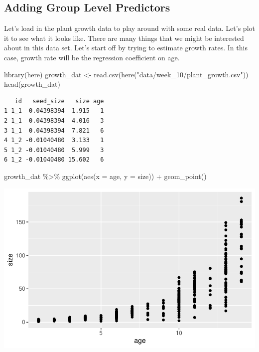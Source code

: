 \documentclass[
  letterpaper,
  DIV=11,
  numbers=noendperiod]{scrartcl}
\newenvironment{Shaded}{\begin{snugshade}}{\end{snugshade}}
\newcommand{\AttributeTok}[1]{\textcolor[rgb]{0.40,0.45,0.13}{#1}}
\newcommand{\FunctionTok}[1]{\textcolor[rgb]{0.28,0.35,0.67}{#1}}
\newcommand{\NormalTok}[1]{\textcolor[rgb]{0.00,0.23,0.31}{#1}}
\newcommand{\OtherTok}[1]{\textcolor[rgb]{0.00,0.23,0.31}{#1}}
\newcommand{\SpecialCharTok}[1]{\textcolor[rgb]{0.37,0.37,0.37}{#1}}
\newcommand{\StringTok}[1]{\textcolor[rgb]{0.13,0.47,0.30}{#1}}
\begin{document}
\subsection{Adding Group Level
Predictors}\label{adding-group-level-predictors}

Let's load in the plant growth data to play around with some real data.
Let's plot it to see what it looks like. There are many things that we
might be interested about in this data set. Let's start off by trying to
estimate growth rates. In this case, growth rate will be the regression
coefficient on age.

\begin{Shaded}
\begin{Highlighting}[]
\FunctionTok{library}\NormalTok{(here)}
\NormalTok{growth\_dat }\OtherTok{\textless{}{-}} \FunctionTok{read.csv}\NormalTok{(}\FunctionTok{here}\NormalTok{(}\StringTok{"data/week\_10/plant\_growth.csv"}\NormalTok{))}
\FunctionTok{head}\NormalTok{(growth\_dat)}
\end{Highlighting}
\end{Shaded}

\begin{verbatim}
   id   seed_size   size age
1 1_1  0.04398394  1.915   1
2 1_1  0.04398394  4.016   3
3 1_1  0.04398394  7.821   6
4 1_2 -0.01040480  3.133   1
5 1_2 -0.01040480  5.999   3
6 1_2 -0.01040480 15.602   6
\end{verbatim}

\begin{Shaded}
\begin{Highlighting}[]
\NormalTok{growth\_dat }\SpecialCharTok{\%\textgreater{}\%} 
  \FunctionTok{ggplot}\NormalTok{(}\FunctionTok{aes}\NormalTok{(}\AttributeTok{x =}\NormalTok{ age, }\AttributeTok{y =}\NormalTok{ size)) }\SpecialCharTok{+}
  \FunctionTok{geom\_point}\NormalTok{()}
\end{Highlighting}
\end{Shaded}

\includegraphics{varying_intercepts_varying_slopes_files/figure-pdf/unnamed-chunk-8-1.pdf}
\end{document}
